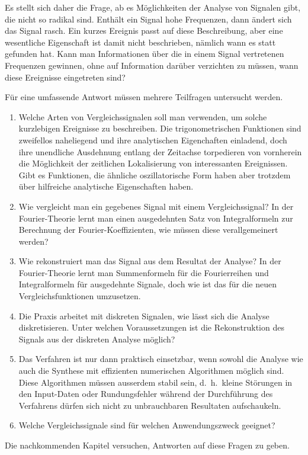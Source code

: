 Es stellt sich daher die Frage, ab es Möglichkeiten der Analyse von Signalen
gibt, die nicht so radikal sind.
Enthält ein Signal hohe Frequenzen, dann ändert sich das Signal rasch.
Ein kurzes Ereignis passt auf diese Beschreibung, aber eine wesentliche
Eigenschaft ist damit nicht beschrieben, nämlich wann es statt gefunden hat.
Kann man Informationen über die in einem Signal vertretenen Frequenzen gewinnen,
ohne auf Information darüber verzichten zu müssen, wann diese Ereignisse
eingetreten sind?

Für eine umfassende Antwort müssen mehrere Teilfragen untersucht werden.
\begin{enumerate}
\item
Welche Arten von Vergleichssignalen soll man verwenden, um solche kurzlebigen
Ereignisse zu beschreiben.
Die trigonometrischen Funktionen sind zweifellos naheliegend und ihre
analytischen Eigenchaften einladend, doch ihre unendliche Ausdehnung entlang
der Zeitachse torpedieren von vornherein die Möglichkeit der zeitlichen
Lokalisierung von interessanten Ereignissen.
Gibt es Funktionen, die ähnliche oszillatorische Form haben
aber trotzdem über hilfreiche analytische Eigenschaften haben.
\item
Wie vergleicht man ein gegebenes Signal mit einem Vergleichssignal?
In der Fourier-Theorie lernt man einen ausgedehnten Satz von Integralformeln
zur Berechnung der Fourier-Koeffizien\-ten, wie müssen diese verallgemeinert
werden?
\item
Wie rekonstruiert man das Signal aus dem Resultat der Analyse?
In der Fourier-Theorie lernt man Summenformeln für die Fourierreihen
und Integralformeln für ausgedehnte Signale, doch wie ist das für 
die neuen Vergleichsfunktionen umzusetzen.
\item
Die Praxis arbeitet mit diskreten Signalen, wie lässt sich die Analyse
diskretisieren.
Unter welchen Voraussetzungen ist die Rekonstruktion des Signals
aus der diskreten Analyse möglich?
\item
Das Verfahren ist nur dann praktisch einsetzbar, wenn sowohl die Analyse wie
auch die Synthese mit effizienten numerischen Algorithmen möglich sind.
Diese Algorithmen müssen ausserdem stabil sein, d.~h.~kleine Störungen in
den Input-Daten oder Rundungsfehler während der Durchführung des Verfahrens
dürfen sich nicht zu unbrauchbaren Resultaten aufschaukeln.
\item
Welche Vergleichssignale sind für welchen Anwendungszweck geeignet?
\end{enumerate}
Die nachkommenden Kapitel versuchen, Antworten auf diese Fragen zu
geben.

